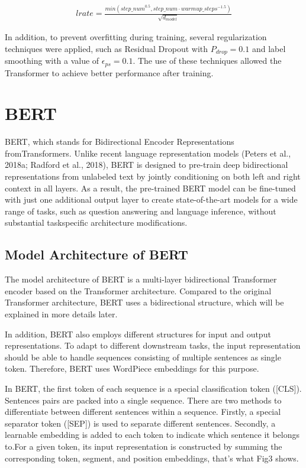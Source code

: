 \documentclass{IEEEtran}
\begin{document}
\begin{align*}
    lrate = \frac{min({step\_num}^{0.5}, step\_num \cdot warmup\_steps^{-1.5})}{\sqrt{d_{model}}}
\end{align*}

\par In addition, to prevent overfitting during training, several regularization 
techniques were applied, such as Residual Dropout with $P_{drop} = 0.1$ and label 
smoothing with a value of $\epsilon_{ps} = 0.1$. The use of these techniques allowed 
the Transformer to achieve better performance after training.

\section{BERT}

\par BERT, which stands for Bidirectional Encoder Representations fromTransformers. 
Unlike recent language representation models (Peters et al., 2018a; Radford et al., 2018), 
BERT is designed to pre-train deep bidirectional representations from
unlabeled text by jointly conditioning on both left and right context in all layers. As a 
result, the pre-trained BERT model can be fine-tuned with just one additional output layer
to create state-of-the-art models for a wide range of tasks, such as question answering and
language inference, without substantial taskspecific architecture modifications.

\subsection{Model Architecture of BERT}
\par The model architecture of BERT is a multi-layer bidirectional Transformer encoder 
based on the Transformer architecture. Compared to the original Transformer architecture, 
BERT uses a bidirectional structure, which will be explained in more details later.

\par In addition, BERT also employs different structures for input and output 
representations. To adapt to different downstream tasks, the input representation 
should be able to handle sequences consisting of multiple sentences as single token. 
Therefore, BERT uses WordPiece embeddings for this purpose.

\par In BERT, the first token of each sequence is a special classification token ([CLS]). 
Sentences pairs are packed into a single sequence. There are two methods to differentiate 
between different sentences within a sequence. Firstly, a special separator token ([SEP]) 
is used to separate different sentences. Secondly, a learnable embedding is added to each 
token to indicate which sentence it belongs to.For a given token, its input representation 
is constructed by summing the corresponding token, segment, and position embeddings, that's 
what Fig3 shows.
\end{document}
